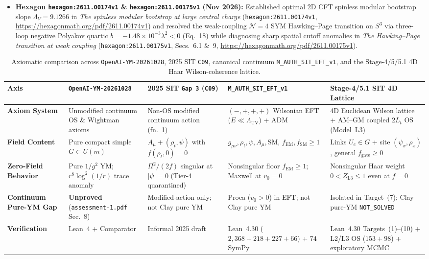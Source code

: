 \begin{enumerate}[leftmargin=2em]
\begin{itemize}
    \item \textbf{Hexagon \texttt{hexagon:2611.00174v1} \& \texttt{hexagon:2611.00175v1} (Nov 2026):} Established optimal 2D CFT spinless modular bootstrap slope $\Lambda_V = 9.1266$ in \emph{The spinless modular bootstrap at large central charge} (\texttt{hexagon:2611.00174v1}, \url{https://hexagonmath.org/pdf/2611.00174v1}) and resolved the weak-coupling $\mathcal{N}=4$ SYM Hawking--Page transition on $S^3$ via three-loop negative Polyakov quartic $b = -1.48\times 10^{-3}\lambda^2 < 0$ (Eq.~18) while diagnosing sharp spatial cutoff anomalies in \emph{The Hawking--Page transition at weak coupling} (\texttt{hexagon:2611.00175v1}, Secs.~6.1 \&~9, \url{https://hexagonmath.org/pdf/2611.00175v1}).
  \end{itemize}
\end{enumerate}

\begin{table}[htbp]
\centering
\caption{Axiomatic comparison across \texttt{OpenAI-YM-20261028}, 2025 SIT \texttt{C09}, canonical continuum \texttt{M\_AUTH\_SIT\_EFT\_v1}, and the Stage-4/5/5.1 4D Haar Wilson-coherence lattice.}
\label{tab:2025-vs-2026-axiomatic}
\vspace{0.4em}
\footnotesize
\begin{tabular}{|p{2.2cm}|p{2.9cm}|p{2.7cm}|p{2.9cm}|p{3.0cm}|}
\hline
\textbf{Axis} & \textbf{\texttt{OpenAI-YM-20261028}} & \textbf{2025 SIT \texttt{Gap 3} (\texttt{C09})} & \textbf{\texttt{M\_AUTH\_SIT\_EFT\_v1}} & \textbf{Stage-4/5.1 SIT 4D Lattice} \\
\hline
\textbf{Axiom System} & Unmodified continuum OS \& Wightman axioms & Non-OS modified continuum action (fn.~1) & $(-,+,+,+)$ Wilsonian EFT ($E\ll\Lambda_{\mathrm{UV}}$) + ADM & 4D Euclidean Wilson lattice + AM--GM coupled $2L_t$ OS (Model~L3) \\
\hline
\textbf{Field Content} & Pure compact simple $G \subset U(m)$ & $A_\mu + (\rho_t,\psi)$ with $f(\rho_t,0)=0$ & $g_{\mu\nu},\rho_t,\psi,A_\mu,\mathrm{SM}$, $f_{\mathrm{EM}},f_{\mathrm{SM}}\ge 1$ & Links $U_e\in G$ + site $(\psi_x,\rho_x)$, general $f_{\mathrm{gate}}\ge 0$ \\
\hline
\textbf{Zero-Field Behavior} & Pure $1/g^2$ YM; $r^8\log^2(1/r)$ trace anomaly & $\Pi^2/(2f)$ singular at $|\psi|=0$ (Tier-4 quarantined) & Nonsingular floor $f_{\mathrm{EM}}\ge 1$; Maxwell at $v_0=0$ & Nonsingular Haar weight $0 < Z_{\mathrm{L3}} \le 1$ even at $f=0$ \\
\hline
\textbf{Continuum Pure-YM Gap} & \textbf{Unproved} (\texttt{assessment-1.pdf} Sec.~8) & Modified-action only; not Clay pure YM & Proca ($v_0>0$) in EFT; not Clay pure YM & Isolated in Target~(7); Clay pure-YM \texttt{NOT\_SOLVED} \\
\hline
\textbf{Verification} & Lean~4 + Comparator & Informal 2025 draft & Lean~4.30 ($2{,}368 + 218 + 227 + 66$) + $74$ SymPy & Lean~4.30 Targets~(1)--(10) + L2/L3 OS ($153+98$) + exploratory MCMC \\
\hline
\end{tabular}
\end{table}

